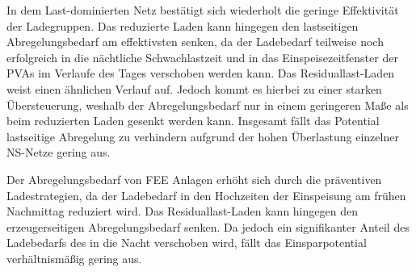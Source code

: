 In dem Last-dominierten Netz bestätigt sich wiederholt die geringe Effektivität der Ladegruppen.
Das reduzierte Laden kann hingegen den lastseitigen Abregelungsbedarf am effektivsten senken, da der Ladebedarf teilweise noch erfolgreich in die nächtliche Schwachlastzeit und in das Einspeisezeitfenster der \glspl{PVA} im Verlaufe des Tages verschoben werden kann.
Das Residuallast-Laden weist einen ähnlichen Verlauf auf.
Jedoch kommt es hierbei zu einer starken Übersteuerung, weshalb der Abregelungsbedarf nur in einem geringeren Maße als beim reduzierten Laden gesenkt werden kann.
Insgesamt fällt das Potential lastseitige Abregelung zu verhindern aufgrund der hohen Überlastung einzelner \gls{NS}-Netze gering aus.\medskip

Der Abregelungsbedarf von \gls{FEE} Anlagen erhöht sich durch die präventiven Ladestrategien, da der Ladebedarf in den Hochzeiten der Einspeisung am frühen Nachmittag reduziert wird.
Das Residuallast-Laden kann hingegen den erzeugerseitigen Abregelungsbedarf senken.
Da jedoch ein signifikanter Anteil des Ladebedarfs des \UC \zH in die Nacht verschoben wird, fällt das Einsparpotential verhältnismäßig gering aus.

\clearpage
